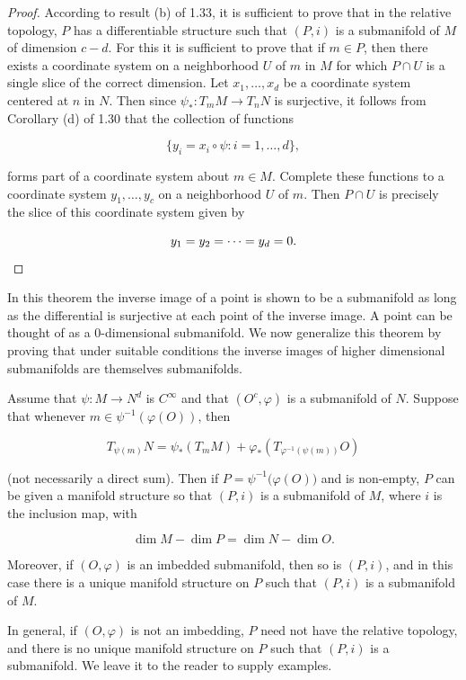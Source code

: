 \begin{proof}
	According to result (b) of 1.33, it is sufficient to prove that in the relative topology, $P$ has a differentiable structure such that $(P,i)$ is a submanifold of $M$ of dimension $c-d$. For this it is sufficient to prove that if $m\in P$, then there exists a coordinate system on a neighborhood $U$ of $m$ in $M$ for which $P\cap U$ is a single slice of the correct dimension. Let $x_{1},\ldots,x_{d}$ be a coordinate system centered at $n$ in $N$. Then since $\psi_{*}:T_{m} M\to T_{n} N$ is surjective, it follows from Corollary (d) of 1.30 that the collection of functions

	\[
		\{y_{i}=x_{i}\circ\psi\colon i=1,\ldots,d\},
	\]

	forms part of a coordinate system about $m\in M$. Complete these functions to a coordinate system $y_1,\ldots,y_c$ on a neighborhood $U$ of $m$. Then $P\cap U$ is precisely the slice of this coordinate system given by

	\[
		y_{1}=y_{2}=\cdots=y_{d}=0.
		\qedhere
	\]
\end{proof}

In this theorem the inverse image of a point is shown to be a submanifold as long as the differential is surjective at each point of the inverse image. A point can be thought of as a 0-dimensional submanifold. We now generalize this theorem by proving that under suitable conditions the inverse images of higher dimensional submanifolds are themselves submanifolds.

\begin{theorem}\label{thm:1.39}
	Assume that $\psi: M \to N^d$ is $C^\infty$ and that $(O^c, \varphi)$ is a submanifold of $N$. Suppose that whenever $m \in \psi^{-1}\left(\varphi(O)\right)$, then

	\begin{equation}
		\tag{1}\label{eq:1.39:1}
		T_{\psi(m)} N=\psi_{*}(T_{m} M)+\varphi_{*}(T_{\varphi^{-1}(\psi(m))} O)
	\end{equation}

	(not necessarily a direct sum). Then if $P=\psi^{-1}\big(\varphi(O)\big)$ and is non-empty, $P$ can be given a manifold structure so that $(P,i)$ is a submanifold of $M$, where $i$ is the inclusion map, with

	\begin{equation}
		\tag{2}\label{eq:1.39:2}
		\dim M-\dim P=\dim N-\dim O.
	\end{equation}

	Moreover, if $(O,\varphi)$ is an imbedded submanifold, then so is $(P,i)$, and in this case there is a unique manifold structure on $P$ such that $(P,i)$ is a submanifold of $M$.

	In general, if $(O,\varphi)$ is not an imbedding, $P$ need not have the relative topology, and there is no unique manifold structure on $P$ such that $(P,i)$ is a submanifold. We leave it to the reader to supply examples.

\end{theorem}

